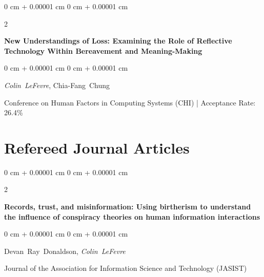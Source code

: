 \documentclass[10pt, letterpaper]{article}
\newenvironment{onecolentry}{
    \begin{adjustwidth}{
        0 cm + 0.00001 cm
    }{
        0 cm + 0.00001 cm
    }
}{
    \end{adjustwidth}
} %
\newenvironment{twocolentry}[2][]{
    \onecolentry
    \def\secondColumn{#2}
    \setcolumnwidth{\fill, 4.5 cm}
    \begin{paracol}{2}
}{
    \switchcolumn \raggedleft \secondColumn
    \end{paracol}
    \endonecolentry
} %
\begin{document}
        
        \begin{samepage}
            \begin{twocolentry}{
                2024
            }
                \textbf{New Understandings of Loss: Examining the Role of Reflective Technology Within Bereavement and Meaning-Making}
            \end{twocolentry}

            \vspace{0.10 cm}
            
            \begin{onecolentry}
                \mbox{\textit{Colin LeFevre}}, \mbox{Chia-Fang Chung}

                \vspace{0.10 cm}
                
        Conference on Human Factors in Computing Systems (CHI) | Acceptance Rate: 26.4\%\end{onecolentry}
        \end{samepage}


    
    \section{Refereed Journal Articles}



        
        \begin{samepage}
            \begin{twocolentry}{
                2022
            }
                \textbf{Records, trust, and misinformation: Using birtherism to understand the influence of conspiracy theories on human information interactions}
            \end{twocolentry}

            \vspace{0.10 cm}
            
            \begin{onecolentry}
                \mbox{Devan Ray Donaldson}, \mbox{\textit{Colin LeFevre}}

                \vspace{0.10 cm}
                
        Journal of the Association for Information Science and Technology (JASIST)\end{onecolentry}
        \end{samepage}
\end{document}
